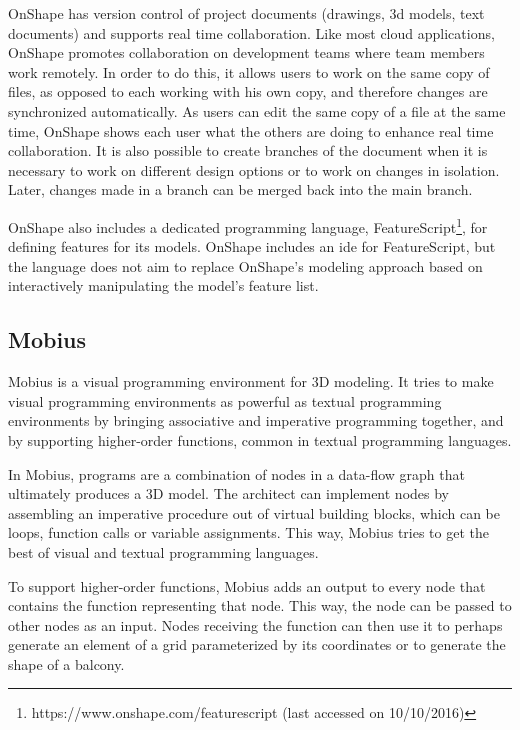 OnShape has version control of project documents (drawings, 3d models, text documents) and supports real time collaboration.
Like most cloud applications, OnShape promotes collaboration on development teams where team members work remotely.
In order to do this, it allows users to work on the same copy of files, as opposed to each working with his own copy, and therefore changes are synchronized automatically.
As users can edit the same copy of a file at the same time, OnShape shows each user what the others are doing to enhance real time collaboration.
It is also possible to create branches of the document when it is necessary to work on different design options or to work on changes in isolation.
Later, changes made in a branch can be merged back into the main branch.

OnShape also includes a dedicated programming language, FeatureScript\footnote{https://www.onshape.com/featurescript (last accessed on 10/10/2016)}, for defining features for its models.
OnShape includes an \gls{ide} for FeatureScript, but the language does not aim to replace OnShape's modeling approach based on interactively manipulating the model's feature list.


\subsection{Mobius}

Mobius is a visual programming environment for 3D modeling.
It tries to make visual programming environments as powerful as textual programming environments by bringing associative and imperative programming together, and by supporting higher-order functions, common in textual programming languages\cite{Janssen2016}.

In Mobius, programs are a combination of nodes in a data-flow graph that ultimately produces a 3D model.
The architect can implement nodes by assembling an imperative procedure out of virtual building blocks, which can be loops, function calls or variable assignments.
This way, Mobius tries to get the best of visual and textual programming languages.

To support higher-order functions, Mobius adds an output to every node that contains the function representing that node.
This way, the node can be passed to other nodes as an input.
Nodes receiving the function can then use it to perhaps generate an element of a grid parameterized by its coordinates or to generate the shape of a balcony.


